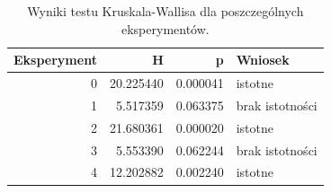 \begin{table}
\caption{Wyniki testu Kruskala-Wallisa dla poszczególnych eksperymentów.}
\label{tab:kruskal_exp}
\begin{tabular}{rrrl}
\toprule
Eksperyment & H & p & Wniosek \\
\midrule
0 & 20.225440 & 0.000041 & istotne \\
1 & 5.517359 & 0.063375 & brak istotności \\
2 & 21.680361 & 0.000020 & istotne \\
3 & 5.553390 & 0.062244 & brak istotności \\
4 & 12.202882 & 0.002240 & istotne \\
\bottomrule
\end{tabular}
\end{table}

